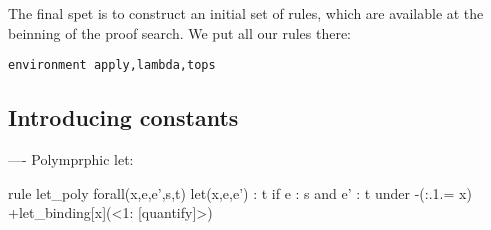 \documentclass[a4paper,12pt]{article}
\begin{document}
The final spet is to construct an initial set of rules, which are available at the beinning of the proof search.  We put all our rules there:
\begin{verbatim}
environment apply,lambda,tops
\end{verbatim}

\subsection{Introducing constants}



----
Polymprphic let:

  rule let_poly
  forall(x,e,e’,s,t)
    let(x,e,e’) : t
  if e : s
  and e’ : t
  under -(:.1.= x) +let_binding[x](<1: [quantify]>)
\end{document}
